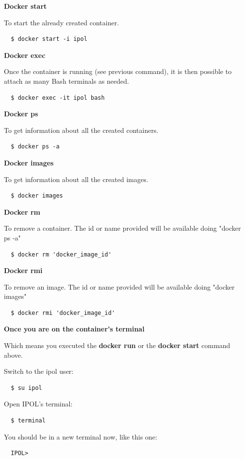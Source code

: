 \documentclass[a4paper,12pt]{article}
\begin{document}
\textbf{Docker start}

To start the already created container.
\begin{verbatim}
  $ docker start -i ipol
\end{verbatim}

\textbf{Docker exec}

Once the container is running (see previous command), it is then possible to attach as many Bash terminals as needed.
\begin{verbatim}
  $ docker exec -it ipol bash
\end{verbatim}

\textbf{Docker ps}

To get information about all the created containers.
\begin{verbatim}
  $ docker ps -a
\end{verbatim}

\textbf{Docker images}

To get information about all the created images.
\begin{verbatim}
  $ docker images
\end{verbatim}

\textbf{Docker rm}

To remove a container. The id or name provided will be available doing "docker ps -a"
\begin{verbatim}
  $ docker rm 'docker_image_id'
\end{verbatim}

\textbf{Docker rmi}

To remove an image. The id or name provided will be available doing "docker images"
\begin{verbatim}
  $ docker rmi 'docker_image_id'
\end{verbatim}

\textbf{Once you are on the container's terminal}

Which means you executed the \textbf{docker run} or the \textbf{docker start} command above.

Switch to the ipol user:
\begin{verbatim}
  $ su ipol
\end{verbatim}

Open IPOL's terminal:
\begin{verbatim}
  $ terminal
\end{verbatim}

You should be in a new terminal now, like this one:
\begin{verbatim}
  IPOL>
\end{verbatim}
\end{document}
